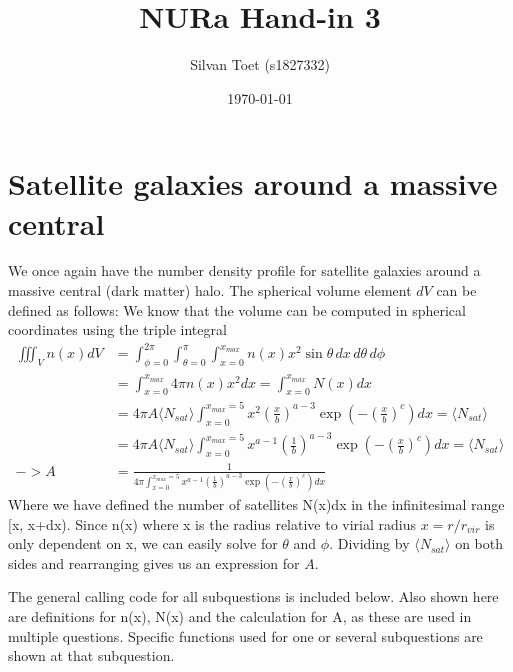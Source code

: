 \documentclass{article}
\title{NURa Hand-in 3}
\author{Silvan Toet (s1827332)}
\date{\today}
\newcommand{\CodeDir}{Code}
\begin{document}
\maketitle

\section{Satellite galaxies around a massive central}
We once again have the number density profile for satellite galaxies around a massive central (dark matter) halo.
The spherical volume element \(dV\) can be defined as follows:
We know that the volume can be computed in spherical coordinates using the triple integral
\begin{align}
  \iiint_V n(x) dV & = \int_{\phi=0}^{2\pi} \int_{\theta=0}^{\pi} \int_{x=0}^{x_{max}} n(x) x^2 \sin\theta \, dx\,d\theta\,d\phi                                                    \\
                   & = \int_{x=0}^{x_{max}} 4 \pi n(x) x^2 dx = \int_{x=0}^{x_{max}} N(x) dx                                                                                        \\
                   & = 4 \pi A \langle N_{sat} \rangle \int_{x=0}^{x_{max}=5} x^2 \left(\frac{x}{b}\right)^{a-3} \exp(-\left(\frac{x}{b}\right)^c) dx = \langle N_{sat} \rangle     \\
                   & = 4 \pi A \langle N_{sat} \rangle \int_{x=0}^{x_{max}=5} x^{a-1} \left(\frac{1}{b}\right)^{a-3} \exp(-\left(\frac{x}{b}\right)^c) dx = \langle N_{sat} \rangle \\
  -> A             & = \frac{1}{4 \pi \int_{x=0}^{x_{max}=5} x^{a-1} \left(\frac{1}{b}\right)^{a-3} \exp(-\left(\frac{x}{b}\right)^c) dx}
\end{align}
Where we have defined the number of satellites N(x)dx in the infinitesimal range [x, x+dx).
Since n(x) where x is the radius relative to virial radius \(x=r/r_{vir}\) is only dependent on x, we can easily solve for \(\theta\) and \(\phi\).
Dividing by \(\langle N_{sat} \rangle\) on both sides and rearranging gives us an expression for \(A\).

The general calling code for all subquestions is included below.
Also shown here are definitions for n(x), N(x) and the calculation for A, as these are used in multiple questions.
Specific functions used for one or several subquestions are shown at that subquestion.



\end{document}
